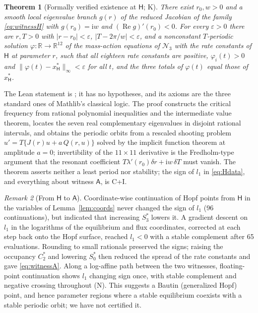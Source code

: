 \documentclass[11pt,a4paper]{article}
\theoremstyle{plain}
\newtheorem{theorem}{Theorem}[section]
\theoremstyle{definition}
\theoremstyle{remark}
\newtheorem{remark}[theorem]{Remark}
\newcommand{\R}{\mathbb R}
\newcommand{\ii}{\mathrm i}
\newcommand{\cN}{\mathcal N}
\newcommand{\WA}{\mathsf A}
\newcommand{\WH}{\mathsf H}
\DeclareMathOperator{\Ree}{Re}
\newcommand{\evC}{\textsf{C}}
\newcommand{\evI}{\textsf{I}}
\newcommand{\evK}{\textsf{K}}
\newcommand{\evN}{\textsf{N}}
\begin{document}
\begin{theorem}[Formally verified existence at $\WH$; \evK]\label{thm:lean}
There exist $r_0,w>0$ and a smooth local eigenvalue branch $g(r)$ of the reduced Jacobian of the family \eqref{eq:witnessH} with $g(r_0)=\ii w$ and $(\Ree g)'(r_0)<0$. For every $\varepsilon>0$ there are $r,T>0$ with $|r-r_0|<\varepsilon$, $|T-2\pi/w|<\varepsilon$, and a nonconstant $T$-periodic solution $\varphi:\R\to\R^{12}$ of the mass-action equations of $\cN_3$ with the rate constants of $\WH$ at parameter $r$, such that all eighteen rate constants are positive, $\varphi_i(t)>0$ and $\|\varphi(t)-x^*_{\WH}\|_\infty<\varepsilon$ for all $t$, and the three totals of $\varphi(t)$ equal those of $x^*_{\WH}$.
\end{theorem}
The Lean statement is ; it has no hypotheses, and its axioms are the three standard ones of Mathlib's classical logic. The proof constructs the critical frequency from rational polynomial inequalities and the intermediate value theorem, locates the seven real complementary eigenvalues in disjoint rational intervals, and obtains the periodic orbits from a rescaled shooting problem $u'=T\{J(r)u+a\,Q(r,u)\}$ solved by the implicit function theorem at amplitude $a=0$; invertibility of the $11\times11$ derivative is the Fredholm-type argument that the resonant coefficient $T\lambda'(r_0)\delta r+\ii w\,\delta T$ must vanish. The theorem asserts neither a least period nor stability; the sign of $l_1$ in \eqref{eq:Hdata}, and everything about witness $\WA$, is \evC+\evI.

\begin{remark}[From $\WH$ to $\WA$]
Coordinate-wise continuation of Hopf points from $\WH$ in the variables of Lemma~\ref{lem:coords} never changed the sign of $l_1$ (96 continuations), but indicated that increasing $S_3^*$ lowers it. A gradient descent on $l_1$ in the logarithms of the equilibrium and flux coordinates, corrected at each step back onto the Hopf surface, reached $l_1<0$ with a stable complement after 65 evaluations. Rounding to small rationals preserved the signs; raising the occupancy $C_2^*$ and lowering $S_0^*$ then reduced the spread of the rate constants and gave \eqref{eq:witnessA}. Along a log-affine path between the two witnesses, floating-point continuation shows $l_1$ changing sign once, with stable complement and negative crossing throughout (\evN). This suggests a Bautin (generalized Hopf) point, and hence parameter regions where a stable equilibrium coexists with a stable periodic orbit; we have not certified it.
\end{remark}
\end{document}
